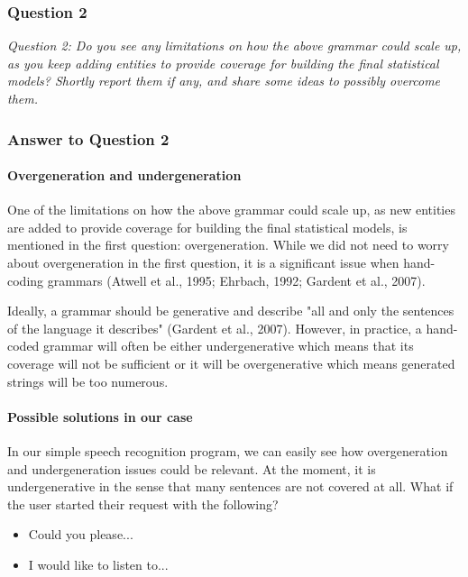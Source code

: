 \documentclass[12pt, a4paper]{article}
\begin{document}
\subsubsection{Question 2}

\emph{Question 2: Do you see any limitations on how the above grammar could scale up, as you keep adding entities to
provide coverage for building the final statistical models? Shortly report them if any, and share some ideas to possibly overcome them.}

\subsubsection{Answer to Question 2}

\paragraph{Overgeneration and undergeneration}\mbox{}

One of the limitations on how the above grammar could scale up, as new entities are added to provide coverage for building the final statistical models, is mentioned in the first question: overgeneration. While we did not need to worry about overgeneration in the first question, it is a significant issue when hand-coding grammars (Atwell et al., 1995; Ehrbach, 1992; Gardent et al., 2007).

Ideally, a grammar should be generative and describe "all and only the sentences of the language it describes" (Gardent et al., 2007). However, in practice, a hand-coded grammar will often be either undergenerative which means that its coverage will not be sufficient or it will be overgenerative which means generated strings will be too numerous.

\paragraph{Possible solutions in our case}\mbox{}

In our simple speech recognition program, we can easily see how overgeneration and undergeneration issues could be relevant. At the moment, it is undergenerative in the sense that many sentences are not covered at all. What if the user started their request with the following? 

\begin{itemize}
    \item Could you please...
    \item I would like to listen to...
\end{itemize}
\end{document}
